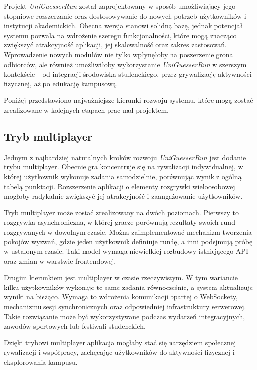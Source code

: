 Projekt \textit{UniGuesserRun} został zaprojektowany w sposób umożliwiający jego stopniowe rozszerzanie oraz dostosowywanie do nowych potrzeb użytkowników i instytucji akademickich. Obecna wersja stanowi solidną bazę, jednak potencjał systemu pozwala na wdrożenie szeregu funkcjonalności, które mogą znacząco zwiększyć atrakcyjność aplikacji, jej skalowalność oraz zakres zastosowań. Wprowadzenie nowych modułów nie tylko wpłynęłoby na poszerzenie grona odbiorców, ale również umożliwiłoby wykorzystanie \textit{UniGuesserRun} w szerszym kontekście -- od integracji środowiska studenckiego, przez grywalizację aktywności fizycznej, aż po edukację kampusową.

Poniżej przedstawiono najważniejsze kierunki rozwoju systemu, które mogą zostać zrealizowane w kolejnych etapach prac nad projektem.

\subsection{Tryb multiplayer}

Jednym z najbardziej naturalnych kroków rozwoju \textit{UniGuesserRun} jest dodanie trybu multiplayer. Obecnie gra koncentruje się na rywalizacji indywidualnej, w której użytkownik wykonuje zadania samodzielnie, porównując wynik z ogólną tabelą punktacji. Rozszerzenie aplikacji o elementy rozgrywki wieloosobowej mogłoby radykalnie zwiększyć jej atrakcyjność i zaangażowanie użytkowników.

Tryb multiplayer może zostać zrealizowany na dwóch poziomach. Pierwszy to rozgrywka asynchroniczna, w której gracze porównują rezultaty swoich rund rozgrywanych w dowolnym czasie. Można zaimplementować mechanizm tworzenia pokojów wyzwań, gdzie jeden użytkownik definiuje rundę, a inni podejmują próbę w ustalonym czasie. Taki model wymaga niewielkiej rozbudowy istniejącego API oraz zmian w warstwie frontendowej.

Drugim kierunkiem jest multiplayer w czasie rzeczywistym. W tym wariancie kilku użytkowników wykonuje te same zadania równocześnie, a system aktualizuje wyniki na bieżąco. Wymaga to wdrożenia komunikacji opartej o WebSockety, mechanizmu sesji synchronicznych oraz odpowiedniej infrastruktury serwerowej. Takie rozwiązanie może być wykorzystywane podczas wydarzeń integracyjnych, zawodów sportowych lub festiwali studenckich.

Dzięki trybowi multiplayer aplikacja mogłaby stać się narzędziem społecznej rywalizacji i współpracy, zachęcając użytkowników do aktywności fizycznej i eksplorowania kampusu.

